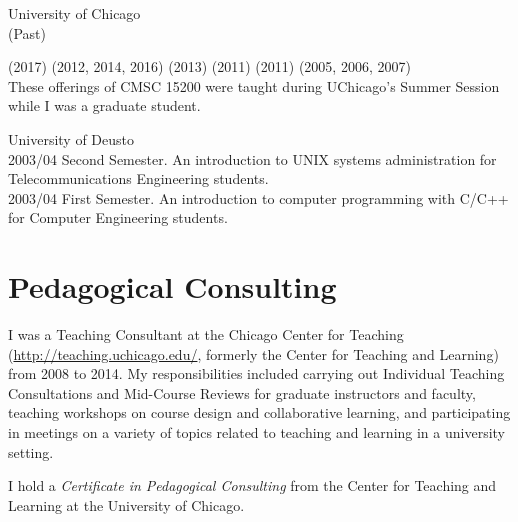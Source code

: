 \documentclass{resume}
\begin{document}
\begin{category}{University of Chicago\\(Past)} 

 (2017)
 (2012, 2014, 2016)
 (2013)
 (2011)
 (2011)
 (2005, 2006, 2007)\\
These offerings of CMSC 15200 were taught during UChicago's Summer Session while I was a graduate student.
\end{category}

\begin{category}{University of Deusto} 
\\
2003/04 Second Semester. An introduction to UNIX systems administration for Telecommunications Engineering students.
\\
2003/04 First Semester. An introduction to computer programming with C/C++ for Computer Engineering students.
\end{category}

\pagebreak

\section*{\hspace{-1cm}Pedagogical Consulting}

I was a Teaching Consultant at the Chicago Center for Teaching (\url{http://teaching.uchicago.edu/}, formerly the Center for Teaching and Learning) from 2008 to 2014. My responsibilities included carrying out Individual Teaching Consultations and Mid-Course Reviews for graduate instructors and faculty, teaching workshops on course design and collaborative learning, and participating in meetings on a variety of topics related to teaching and learning in a university setting.

I hold a \emph{Certificate in Pedagogical Consulting} from the Center for Teaching and Learning at the University of Chicago.
\end{document}
